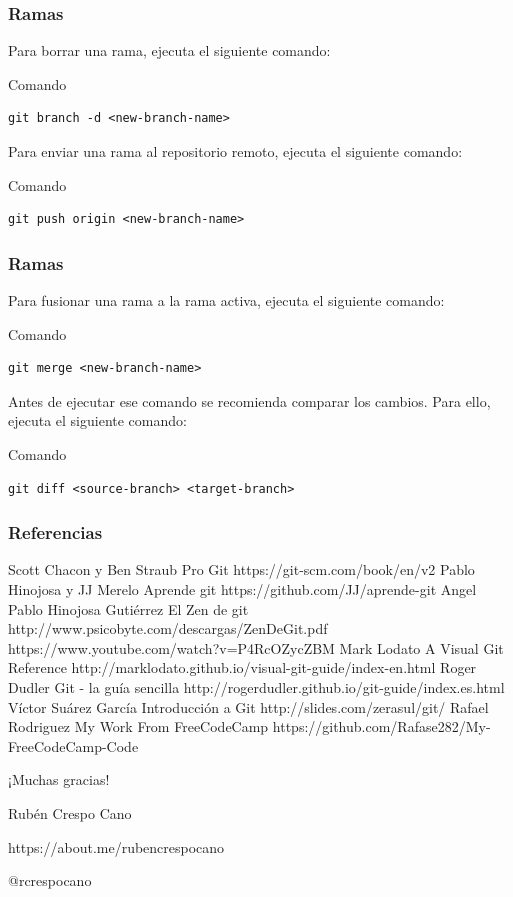 \documentclass{beamer}
\begin{document}
\begin{frame}[fragile]
\frametitle{Ramas}
Para borrar una rama, ejecuta el siguiente comando:
\begin{block}{Comando}
\begin{verbatim}
git branch -d <new-branch-name>
\end{verbatim}
\end{block}
\vskip 0.50cm
Para enviar una rama al repositorio remoto, ejecuta el siguiente comando:
\begin{block}{Comando}
\begin{verbatim}
git push origin <new-branch-name>
\end{verbatim}
\end{block}
\end{frame}

\begin{frame}[fragile]
\frametitle{Ramas}
Para fusionar una rama a la rama activa, ejecuta el siguiente comando:
\begin{block}{Comando}
\begin{verbatim}
git merge <new-branch-name>
\end{verbatim}
\end{block}
\vskip 0.50cm
Antes de ejecutar ese comando se recomienda comparar los cambios. Para ello, ejecuta el siguiente comando:
\begin{block}{Comando}
\begin{verbatim}
git diff <source-branch> <target-branch>
\end{verbatim}
\end{block}
\end{frame}

\begin{frame}
\frametitle{Referencias}
\begin{thebibliography}{99}
\tiny
\bibitem{} Scott Chacon y Ben Straub
\newblock Pro Git
\newblock https://git-scm.com/book/en/v2
\bibitem{} Pablo Hinojosa y JJ Merelo
\newblock Aprende git
\newblock https://github.com/JJ/aprende-git
\bibitem{} Angel Pablo Hinojosa Gutiérrez
\newblock El Zen de git
\newblock http://www.psicobyte.com/descargas/ZenDeGit.pdf
\newblock https://www.youtube.com/watch?v=P4RcOZycZBM
\bibitem{} Mark Lodato
\newblock A Visual Git Reference
\newblock http://marklodato.github.io/visual-git-guide/index-en.html
\bibitem{} Roger Dudler 
\newblock Git - la guía sencilla
\newblock http://rogerdudler.github.io/git-guide/index.es.html
\bibitem{} Víctor Suárez García
\newblock  Introducción a Git
\newblock http://slides.com/zerasul/git/
\bibitem{} Rafael Rodriguez
\newblock My Work From FreeCodeCamp
\newblock https://github.com/Rafase282/My-FreeCodeCamp-Code
\end{thebibliography}
\end{frame}

\begin{frame}
\Huge{\centerline{¡Muchas gracias!}}
\vskip 1.50cm
\small{\centerline{Rubén Crespo Cano}}
\small{\centerline{https://about.me/rubencrespocano}}
\small{\centerline{@rcrespocano}}
\end{frame}
\end{document}

